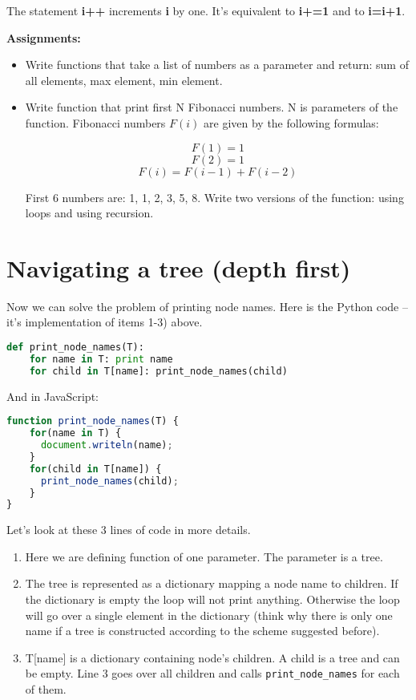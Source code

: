 The statement \textbf{i++} increments \textbf{i} by one. It's equivalent to
\textbf{i+=1} and to \textbf{i=i+1}.

\bigskip
\begin{tcolorbox}
\textbf{Assignments:}
\begin{itemize}
\item Write functions that take a list of numbers as a parameter
and return: sum of all elements, max element, min element.
\item Write function that print first N Fibonacci numbers. N is parameters
of the function. Fibonacci numbers $F(i)$ are given by the following
formulas:

$$F(1) = 1$$ $$F(2) = 1$$ $$F(i) = F(i-1) + F(i-2) $$

First 6 numbers are: 1, 1, 2, 3, 5, 8.
Write two versions of the function: using loops and using recursion.
\end{itemize}
\end{tcolorbox}



\section{Navigating a tree (depth first)}
Now we can solve the problem of printing node names.
Here is the Python code --
it's implementation of items 1-3) above.

\begin{lstlisting}[style=codelst,language=Python]
def print_node_names(T):
    for name in T: print name
    for child in T[name]: print_node_names(child)
\end{lstlisting}

And in JavaScript:
\begin{lstlisting}[style=codelst,language=JavaScript]
function print_node_names(T) {
    for(name in T) {
      document.writeln(name);
    }
    for(child in T[name]) {
      print_node_names(child);
    }
}
\end{lstlisting}

Let's look at these 3 lines of code in more details.

\begin{leftborder}
\begin{enumerate}
\item Here we are defining function of one parameter. The parameter is a tree.
\item The tree is represented as a dictionary mapping a node name to children.
If the dictionary is empty the loop will not print anything. Otherwise the
loop will go over a single element in the dictionary
(think why there is only
one name if a tree is constructed according to the scheme suggested before).
\item T[name] is a dictionary containing node's children. A child is a tree
and can be empty.  Line 3 goes over all children and calls
\lstinline{print_node_names} for each of them.
\end{enumerate}
\end{leftborder}

